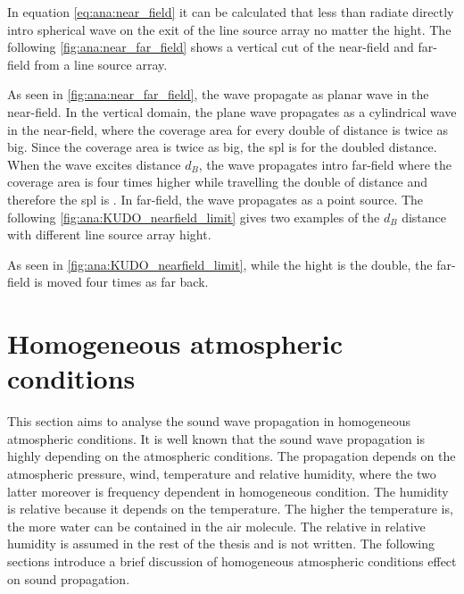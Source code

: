 In equation \autoref{eq:ana:near_field} it can be calculated that less than  radiate directly intro spherical wave on the exit of the line source array no matter the hight. The following \autoref{fig:ana:near_far_field} shows a vertical cut of the near-field and far-field from a line source array. 


As seen in \autoref{fig:ana:near_far_field}, the wave propagate as planar wave in the near-field. In the vertical domain, the plane wave propagates as a cylindrical wave in the near-field, where the coverage area for every double of distance is twice as big. Since the coverage area is twice as big, the \gls{spl} is  for the doubled distance. When the wave excites distance $d_B$, the wave propagates intro far-field where the coverage area is four times higher while travelling the double of distance and therefore the \gls{spl} is . In far-field, the wave propagates as a point source. The following \autoref{fig:ana:KUDO_nearfield_limit} gives two examples of the $d_B$ distance with different line source array hight.


As seen in \autoref{fig:ana:KUDO_nearfield_limit}, while the hight is the double, the far-field is moved four times as far back.


\section{Homogeneous atmospheric conditions}\label{sec:ana:hom_ats_con}
This section aims to analyse the sound wave propagation in homogeneous atmospheric conditions. It is well known that the sound wave propagation is highly depending on the atmospheric conditions. The propagation depends on the atmospheric pressure, wind, temperature and relative humidity, where the two latter moreover is frequency dependent in homogeneous condition. The humidity is relative because it depends on the temperature. The higher the temperature is, the more water can be contained in the air molecule. The relative in relative humidity is assumed in the rest of the thesis and is not written. The following sections introduce a brief discussion of homogeneous atmospheric conditions effect on sound propagation.


